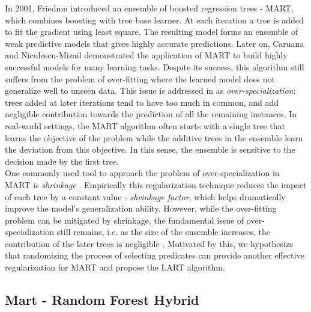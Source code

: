 \documentclass{article} %
\begin{document}
In 2001, Friedmn \cite{mart} introduced an ensemble of boosted regression trees - MART, which combines boosting with tree base learner. At each iteration a tree is added to fit the gradient using least square. The resulting model forms an ensemble of weak predictive models that gives highly accurate predictions. Later on, Caruana and Niculescu-Mizail \cite{Caruana06anempirical} demonstrated the application of MART to build highly successful models for many learning tasks. Despite its success, this algorithm still suffers from the problem of over-fitting where the learned model does not generalize well to unseen data. This issue is addressed in \cite{VinayakG15} as \textit{over-specialization}: trees added at later iterations tend to have too much in common, and add negligible contribution towards the prediction of all the remaining instances. In real-world settings, the MART algorithm often starts with a single tree that learns the objective of the problem while the additive trees in the ensemble learn the deviation from this objective. In this sense, the ensemble is sensitive to the decision made by the first tree.\\

One commonly used tool to approach the problem of over-specialization in MART is \textit{shrinkage} \cite{mart}. Empirically this regularization technique reduces the impact of each tree by a constant value - \textit{shrinkage factor}, which helps dramatically improve the model's generalization ability. However, while the over-fitting problem can be mitigated by shrinkage, the fundamental issue of over-specialization still remains, i.e. as the size of the ensemble increases, the contribution of the later trees is negligible \cite{VinayakG15}. Motivated by this, we hypothesize that randomizing the process of selecting predicates can provide another effective regularization for MART and propose the LART algorithm.


\subsection{Mart - Random Forest Hybrid}

\end{document}
